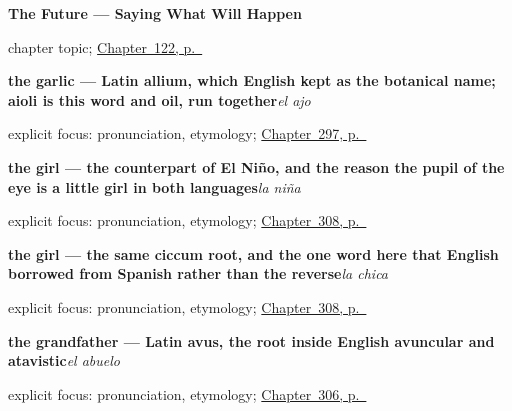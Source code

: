 \noindent\begin{minipage}[t]{\linewidth}
\raggedright
\textbf{The Future --- Saying What Will Happen}\par
\footnotesize chapter topic; \hyperref[ch:spanish-futuro]{Chapter~122, p.~\pageref*{ch:spanish-futuro}}
\end{minipage}\par\smallskip

\noindent\begin{minipage}[t]{\linewidth}
\raggedright
\textbf{the garlic — Latin allium, which English kept as the botanical name; aioli is this word and oil, run together}\enspace\emph{el ajo}\par
\footnotesize explicit focus: pronunciation, etymology; \hyperref[ch:la-cocina]{Chapter~297, p.~\pageref*{ch:la-cocina}}
\end{minipage}\par\smallskip

\noindent\begin{minipage}[t]{\linewidth}
\raggedright
\textbf{the girl --- the counterpart of El Niño, and the reason the pupil of the eye is a little girl in both languages}\enspace\emph{la niña}\par
\footnotesize explicit focus: pronunciation, etymology; \hyperref[ch:ninos-y-gente]{Chapter~308, p.~\pageref*{ch:ninos-y-gente}}
\end{minipage}\par\smallskip

\noindent\begin{minipage}[t]{\linewidth}
\raggedright
\textbf{the girl --- the same ciccum root, and the one word here that English borrowed from Spanish rather than the reverse}\enspace\emph{la chica}\par
\footnotesize explicit focus: pronunciation, etymology; \hyperref[ch:ninos-y-gente]{Chapter~308, p.~\pageref*{ch:ninos-y-gente}}
\end{minipage}\par\smallskip

\noindent\begin{minipage}[t]{\linewidth}
\raggedright
\textbf{the grandfather --- Latin avus, the root inside English avuncular and atavistic}\enspace\emph{el abuelo}\par
\footnotesize explicit focus: pronunciation, etymology; \hyperref[ch:hijos-y-abuelos]{Chapter~306, p.~\pageref*{ch:hijos-y-abuelos}}
\end{minipage}\par\smallskip

